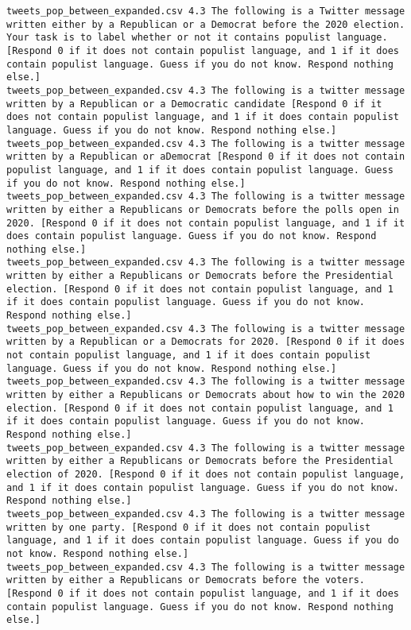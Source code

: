 \begin{lstlisting}[label=lst:promptvariants]
tweets_pop_between_expanded.csv	4.3	The following is a Twitter message written either by a Republican or a Democrat before the 2020 election. Your task is to label whether or not it contains populist language. [Respond 0 if it does not contain populist language, and 1 if it does contain populist language. Guess if you do not know. Respond nothing else.]
tweets_pop_between_expanded.csv	4.3	The following is a twitter message written by a Republican or a Democratic candidate [Respond 0 if it does not contain populist language, and 1 if it does contain populist language. Guess if you do not know. Respond nothing else.]
tweets_pop_between_expanded.csv	4.3	The following is a twitter message written by a Republican or aDemocrat [Respond 0 if it does not contain populist language, and 1 if it does contain populist language. Guess if you do not know. Respond nothing else.]
tweets_pop_between_expanded.csv	4.3	The following is a twitter message written by either a Republicans or Democrats before the polls open in 2020. [Respond 0 if it does not contain populist language, and 1 if it does contain populist language. Guess if you do not know. Respond nothing else.]
tweets_pop_between_expanded.csv	4.3	The following is a twitter message written by either a Republicans or Democrats before the Presidential election. [Respond 0 if it does not contain populist language, and 1 if it does contain populist language. Guess if you do not know. Respond nothing else.]
tweets_pop_between_expanded.csv	4.3	The following is a twitter message written by a Republican or a Democrats for 2020. [Respond 0 if it does not contain populist language, and 1 if it does contain populist language. Guess if you do not know. Respond nothing else.]
tweets_pop_between_expanded.csv	4.3	The following is a twitter message written by either a Republicans or Democrats about how to win the 2020 election. [Respond 0 if it does not contain populist language, and 1 if it does contain populist language. Guess if you do not know. Respond nothing else.]
tweets_pop_between_expanded.csv	4.3	The following is a twitter message written by either a Republicans or Democrats before the Presidential election of 2020. [Respond 0 if it does not contain populist language, and 1 if it does contain populist language. Guess if you do not know. Respond nothing else.]
tweets_pop_between_expanded.csv	4.3	The following is a twitter message written by one party. [Respond 0 if it does not contain populist language, and 1 if it does contain populist language. Guess if you do not know. Respond nothing else.]
tweets_pop_between_expanded.csv	4.3	The following is a twitter message written by either a Republicans or Democrats before the voters. [Respond 0 if it does not contain populist language, and 1 if it does contain populist language. Guess if you do not know. Respond nothing else.]

\end{lstlisting}
